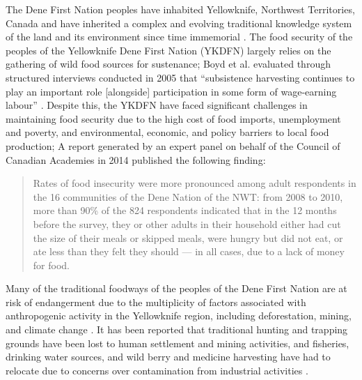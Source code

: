 \documentclass{report}
\begin{document}
\hspace{24pt} The Dene First Nation peoples have inhabited Yellowknife, Northwest Territories, Canada and have inherited a complex and evolving traditional knowledge system of the land and its environment since time immemorial \parencite{lorecapturingtraditional}.
The food security of the peoples of the Yellowknife Dene First Nation (YKDFN) largely relies on the gathering of wild food sources for sustenance;
Boyd et al. evaluated through structured interviews conducted in 2005 that ``subsistence harvesting continues to play an important role [alongside] participation in some form of wage-earning labour'' \parencite[268]{socialculturalcapital}. Despite this, the YKDFN have faced significant challenges in maintaining food security due to the high cost of food imports, unemployment and poverty, and environmental, economic, and policy barriers to local food production; %
A report generated by an expert panel on behalf of the Council of Canadian Academies in 2014 published the following finding:

\begin{quote}
  Rates of food insecurity were more pronounced among adult respondents in the 16 communities of the Dene Nation of the NWT: from 2008 to 2010, more than 90\% of the 824 respondents indicated that in the 12 months before the survey, they or other adults in their household either had cut the size of their meals or skipped meals, were hungry but did not eat, or ate less than they felt they should — in all cases, due to a lack of money for food. \parencite[42]{aboriginalfoodsecurity}
\end{quote}




\hspace{24pt} Many of the traditional foodways of the peoples of the Dene First Nation are at risk of endangerment due to the multiplicity of factors associated with anthropogenic activity in the Yellowknife region, including deforestation, mining, and climate change \parencite{denefoodwaysontologies}.
It has been reported that traditional hunting and trapping grounds have been lost to human settlement and mining activities, and fisheries, drinking water sources, and wild berry and medicine harvesting have had to relocate due to concerns over contamination from industrial activities \parencite{riskperceptions}.
\end{document}
